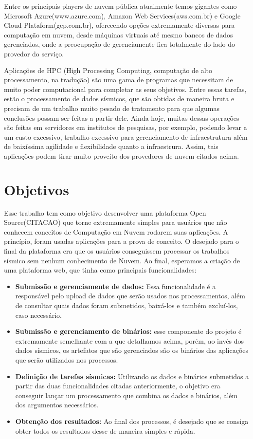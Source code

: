 \documentclass[11pt,twoside]{article}
\begin{document}
Entre os principais players de nuvem pública atualmente temos gigantes como Microsoft Azure(www.azure.com), Amazon Web Services(aws.com.br) e Google Cloud Plataform(gcp.com.br), 
oferecendo opções extremamente diversas para computação em nuvem, desde máquinas virtuais até mesmo bancos de dados gerenciados, onde a preocupação de gerenciamente fica totalmente
do lado do provedor do serviço.

Aplicações de HPC (High Processing Computing, computação de alto processamento, na tradução) são uma gama de programas que necessitam de muito poder computacional para 
completar as seus objetivos. Entre essas tarefas, estão o processamento de dados sísmicos, que são obtidas de maneira bruta e precisam de um trabalho muito pesado de tratamento
para que algumas conclusões possam ser feitas a partir dele. Ainda hoje, muitas dessas operações são feitas em servidores em institutos de pesquisas, por exemplo, podendo levar
a um custo excessivo, trabalho excessivo para gerenciamento de infraestrutura além de baixíssima agilidade e flexibilidade quanto a infraestrura. Assim, tais aplicações podem 
tirar muito proveito dos provedores de nuvem citados acima.

\section{Objetivos}
Esse trabalho tem como objetivo desenvolver uma plataforma Open Source(CITACAO) que torne extremamente simples para usuários que não conhecem conceitos de Computação em Nuvem rodarem suas aplicações.
A princípio, foram usadas aplicações para a prova de conceito. O desejado para o final da plataforma era que os usuários conseguissem processar os trabalhos sísmico sem nenhum conhecimento de Nuvem.  
Ao final, esperamos a criação de uma plataforma web, que tinha como principais funcionalidades:

\begin{itemize}
  \item \textbf{Submissão e gerenciamente de dados:} Essa funcionalidade é a responsável pelo upload de dados que serão usados nos processamentos, além de consultar quais dados foram submetidos, baixá-los e também
  excluí-los, caso necessário. 
  \item \textbf{Submissão e gerenciamento de binários:} esse componente do projeto é extremamente semelhante com a que detalhamos acima, porém, ao invés dos dados sísmicos, os artefatos que são gerenciados são os 
  binários das aplicações que serão utilizados nos processos.
  \item \textbf{Definição de tarefas sísmicas:} Utilizando os dados e binários submetidos a partir das duas funcionalidades citadas anteriormente, o objetivo era conseguir lançar um processamento que combina os dados e 
  binários, além dos argumentos necessários.
  \item \textbf{Obtenção dos resultados:} Ao final dos processos, é desejado que se consiga obter todos os resultados desse de maneira simples e rápida.
\end{itemize}
\end{document}
